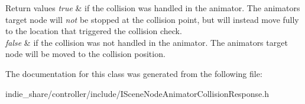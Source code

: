 \begin{DoxyRetVals}{Return values}
{\em true} & if the collision was handled in the animator. The animator\textquotesingle{}s target node will {\itshape not} be stopped at the collision point, but will instead move fully to the location that triggered the collision check. \\
\hline
{\em false} & if the collision was not handled in the animator. The animator\textquotesingle{}s target node will be moved to the collision position. \\
\hline
\end{DoxyRetVals}


The documentation for this class was generated from the following file\+:\begin{DoxyCompactItemize}
\item 
indie\+\_\+share/controller/include/I\+Scene\+Node\+Animator\+Collision\+Response.\+h\end{DoxyCompactItemize}
